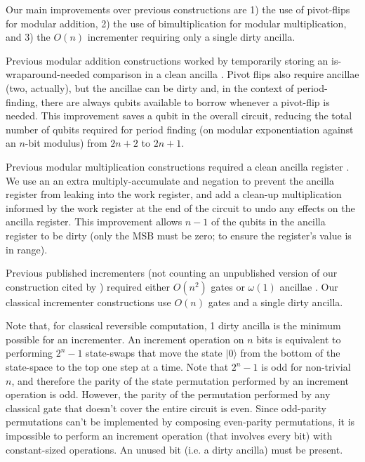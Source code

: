 \documentclass[twocolumn]{article}
\begin{document}
Our main improvements over previous constructions are 1) the use of pivot-flips for modular addition, 2) the use of bimultiplication for modular multiplication, and 3) the $O(n)$ incrementer requiring only a single dirty ancilla.

Previous modular addition constructions worked by temporarily storing an is-wraparound-needed comparison in a clean ancilla \cite{takahashi2006, haner2016}.
Pivot flips also require ancillae (two, actually), but the ancillae can be dirty and, in the context of period-finding, there are always qubits available to borrow whenever a pivot-flip is needed.
This improvement saves a qubit in the overall circuit, reducing the total number of qubits required for period finding (on modular exponentiation against an $n$-bit modulus) from $2n+2$ to $2n+1$.

Previous modular multiplication constructions required a clean ancilla register \cite{haner2016}.
We use an an extra multiply-accumulate and negation to prevent the ancilla register from leaking into the work register, and add a clean-up multiplication informed by the work register at the end of the circuit to undo any effects on the ancilla register.
This improvement allows $n-1$ of the qubits in the ancilla register to be dirty (only the MSB must be zero; to ensure the register's value is in range).

Previous published incrementers (not counting an unpublished version of our construction \cite{gidney2015} cited by \cite{haner2016}) required either $O(n^2)$ gates or $\omega(1)$ ancillae \cite{draper2000, barenco1995}.
Our classical incrementer constructions use $O(n)$ gates and a single dirty ancilla.

Note that, for classical reversible computation, 1 dirty ancilla is the minimum possible for an incrementer.
An increment operation on $n$ bits is equivalent to performing $2^n-1$ state-swaps that move the state $|0\rangle$ from the bottom of the state-space to the top one step at a time.
Note that $2^n-1$ is odd for non-trivial $n$, and therefore the parity of the state permutation performed by an increment operation is odd.
However, the parity of the permutation performed by any classical gate that doesn't cover the entire circuit is even.
Since odd-parity permutations can't be implemented by composing even-parity permutations, it is impossible to perform an increment operation (that involves every bit) with constant-sized operations.
An unused bit (i.e. a dirty ancilla) must be present.
\end{document}
